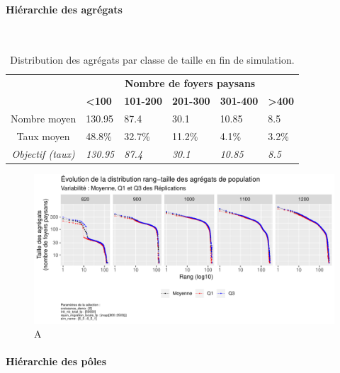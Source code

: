 \paragraph{Hiérarchie des agrégats}~\\


\begin{table}[H]
	\captionsetup{singlelinecheck=off}
	\centering
	\small
	{\renewcommand{\arraystretch}{1.3}%
		\begin{tabular}{p{2.5cm}|p{1.5cm}|p{1.5cm}|p{1.5cm}|p{1.5cm}|p{1.5cm}|}
			\cline{2-6}
			& \multicolumn{5}{c|}{\textbf{Nombre de foyers paysans}} \\
			  & \textbf{<100} & \textbf{101-200} & \textbf{201-300} &  \textbf{301-400} &\textbf{ >400}\\ \hline
			 \multicolumn{1}{|c|}{Nombre moyen} & 130.95 & 87.4 & 30.1 & 10.85 & 8.5 \\ \hline
			 \multicolumn{1}{|c|}{Taux moyen} & 48.8\% & 32.7\% & 11.2\% & 4.1\% & 3.2\% \\ \hline
			 \multicolumn{1}{|c|}{\textit{Objectif (taux)}} & \textit{130.95} & \textit{87.4} & \textit{30.1} & \textit{10.85} & \textit{8.5} \\ \hline	
	\end{tabular}}
	\caption{Distribution des agrégats par classe de taille en fin de simulation.}
	\label{tab:distrib-population-agregats}
\end{table}

\begin{figure}[H]
	\centering
	\includegraphics[width=\linewidth]{img/results_6_5_1/Agregats_RT_Haut.pdf}
	\caption{A}
	\label{}
\end{figure}



\paragraph{Hiérarchie des pôles}~\\

